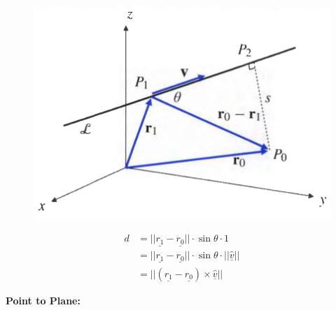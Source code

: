 \documentclass[11pt, a4paper]{MATH2023}
\newcommand{\vct}{\underline}
\newcommand{\vv}{\underline{v}}
\begin{document}
\begin{spacing}{1.3}
    \begin{figure}\centering
        \includegraphics[scale=0.4]{images/Ch10-dist-point-line.png}
    \end{figure}
    \begin{align*}
        d &= ||\vct{r_1}-\vct{r_0}||\cdot \sin\theta \cdot 1\\
         &= ||\vct{r_1}-\vct{r_0}||\cdot \sin\theta \cdot ||\hat{\vv}||\\
         &= ||(\vct{r_1}-\vct{r_0})\times \hat{\vv}||
    \end{align*}

    \vspace{0.8in}

    {\bf Point to Plane:} 


\end{spacing}
\end{document}
